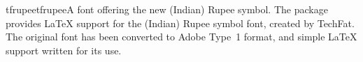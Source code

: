\documentclass{ddltxtyp}
\begin{document}
\begin{package}{tfrupee}{tfrupee}{A font offering the new (Indian) Rupee symbol.}
The package provides {\LaTeX} support for the (Indian) Rupee
symbol font, created by TechFat. The original font has been
converted to Adobe Type~1 format, and simple {\LaTeX} support
written for its use.
\end{package}
\end{document}
